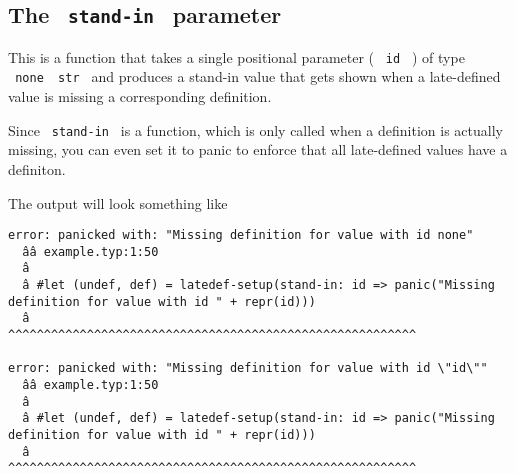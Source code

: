 
\subsection{\texorpdfstring{The \texttt{\ stand-in\ }
parameter}{The  stand-in  parameter}}\label{the-stand-in-parameter}

This is a function that takes a single positional parameter (
\texttt{\ id\ } ) of type \texttt{\ none\ \textbar{}\ str\ } and
produces a stand-in value that gets shown when a late-defined value is
missing a corresponding definition.

\begin{Shaded}
\begin{Highlighting}[]

\end{Highlighting}
\end{Shaded}


Since \texttt{\ stand-in\ } is a function, which is only called when a
definition is actually missing, you can even set it to panic to enforce
that all late-defined values have a definiton.

\begin{Shaded}
\begin{Highlighting}[]
\end{Highlighting}
\end{Shaded}

The output will look something like

\begin{verbatim}
error: panicked with: "Missing definition for value with id none"
  ââ example.typ:1:50
  â
  â #let (undef, def) = latedef-setup(stand-in: id => panic("Missing definition for value with id " + repr(id)))
  â                                                   ^^^^^^^^^^^^^^^^^^^^^^^^^^^^^^^^^^^^^^^^^^^^^^^^^^^^^^^^^

error: panicked with: "Missing definition for value with id \"id\""
  ââ example.typ:1:50
  â
  â #let (undef, def) = latedef-setup(stand-in: id => panic("Missing definition for value with id " + repr(id)))
  â                                                   ^^^^^^^^^^^^^^^^^^^^^^^^^^^^^^^^^^^^^^^^^^^^^^^^^^^^^^^^^
\end{verbatim}

